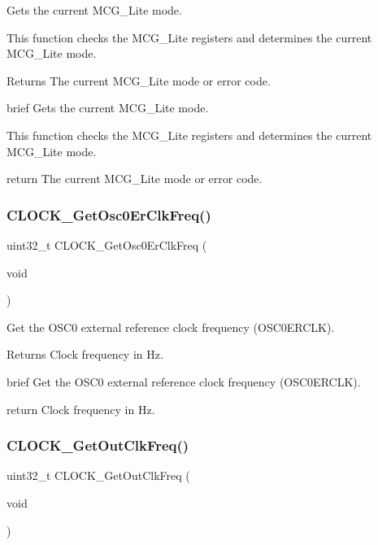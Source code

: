 Gets the current M\+C\+G\+\_\+\+Lite mode. 

This function checks the M\+C\+G\+\_\+\+Lite registers and determines the current M\+C\+G\+\_\+\+Lite mode.

\begin{DoxyReturn}{Returns}
The current M\+C\+G\+\_\+\+Lite mode or error code.
\end{DoxyReturn}
brief Gets the current M\+C\+G\+\_\+\+Lite mode.

This function checks the M\+C\+G\+\_\+\+Lite registers and determines the current M\+C\+G\+\_\+\+Lite mode.

return The current M\+C\+G\+\_\+\+Lite mode or error code. \mbox{\label{group__clock_gaebc45953dc5ae83b02ced8a14e8857b9}} 
\subsubsection{\texorpdfstring{CLOCK\_GetOsc0ErClkFreq()}{CLOCK\_GetOsc0ErClkFreq()}}
{\footnotesize\ttfamily uint32\+\_\+t C\+L\+O\+C\+K\+\_\+\+Get\+Osc0\+Er\+Clk\+Freq (\begin{DoxyParamCaption}\item[{void}]{ }\end{DoxyParamCaption})}



Get the O\+S\+C0 external reference clock frequency (O\+S\+C0\+E\+R\+C\+LK). 

\begin{DoxyReturn}{Returns}
Clock frequency in Hz.
\end{DoxyReturn}
brief Get the O\+S\+C0 external reference clock frequency (O\+S\+C0\+E\+R\+C\+LK).

return Clock frequency in Hz. \mbox{\label{group__clock_gad9df7f4196258f0a9037088784a19380}} 
\subsubsection{\texorpdfstring{CLOCK\_GetOutClkFreq()}{CLOCK\_GetOutClkFreq()}}
{\footnotesize\ttfamily uint32\+\_\+t C\+L\+O\+C\+K\+\_\+\+Get\+Out\+Clk\+Freq (\begin{DoxyParamCaption}\item[{void}]{ }\end{DoxyParamCaption})}



